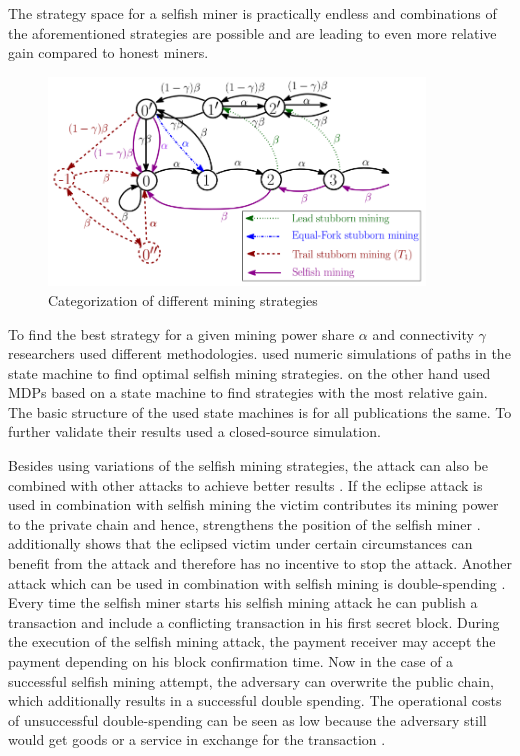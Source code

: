 \documentclass{scrartcl}
\begin{document}
The strategy space for a selfish miner is practically endless and combinations of the aforementioned strategies are possible and are leading to even more relative gain compared to honest miners\cite{nayak2016stubborn,sapirshtein2016optimal, gervais2015tampering, gervais2016security, bahack2013theoretical}.


\begin{figure}[t]
\includegraphics[width=10cm]{figures/stubborn_mining}
\centering
\caption{Categorization of different mining strategies \cite{nayak2016stubborn}}
\label{fig:stubborn_mining}
\end{figure}


To find the best strategy for a given mining power share $\alpha$ and connectivity $\gamma$ researchers used different methodologies.
\cite{gervais2015tampering, nayak2016stubborn} used numeric simulations of paths in the state machine to find optimal selfish mining strategies.
\cite{sapirshtein2016optimal, gervais2016security} on the other hand used MDPs based on a state machine to find strategies with the most relative gain.
The basic structure of the used state machines is for all publications the same.
To further validate their results \cite{eyal2014majority, sapirshtein2016optimal} used a closed-source simulation.

Besides using variations of the selfish mining strategies, the attack can also be combined with other attacks to achieve better results \cite{gervais2016security, sapirshtein2016optimal, nayak2016stubborn, gervais2015tampering}.
If the eclipse attack is used in combination with selfish mining the victim contributes its mining power to the private chain and hence, strengthens the position of the selfish miner \cite{nayak2016stubborn, gervais2016security}.
\cite{nayak2016stubborn} additionally shows that the eclipsed victim under certain circumstances can benefit from the attack and therefore has no incentive to stop the attack.
Another attack which can be used in combination with selfish mining is double-spending \cite{sapirshtein2016optimal, gervais2016security}.
Every time the selfish miner starts his selfish mining attack he can publish a transaction and include a conflicting transaction in his first secret block.
During the execution of the selfish mining attack, the payment receiver may accept the payment depending on his block confirmation time.
Now in the case of a successful selfish mining attempt, the adversary can overwrite the public chain, which additionally results in a successful double spending.
The operational costs of unsuccessful double-spending can be seen as low because the adversary still would get goods or a service in exchange for the transaction \cite{sapirshtein2016optimal, gervais2016security}.
\end{document}
